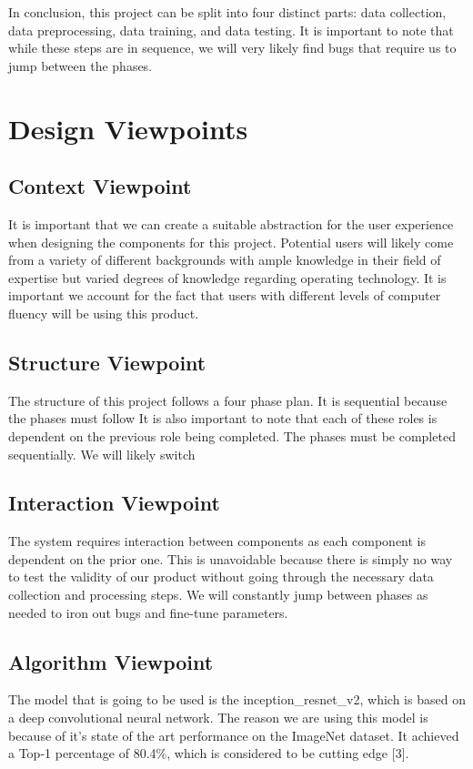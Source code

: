 \documentclass[onecolumn, draftclsnofoot,10pt, compsoc]{IEEEtran}
\begin{document}
In conclusion, this project can be split into four distinct parts: data collection, data preprocessing, data training, and data testing. It is important to note that while these steps are in sequence, we will very likely find bugs that require us to jump between the phases. 

\section{Design Viewpoints}

\subsection{Context Viewpoint}
It is important that we can create a suitable abstraction for the user experience when designing the components for this project. Potential users will likely come from a variety of different backgrounds with ample knowledge in their field of expertise but varied degrees of knowledge regarding operating technology. It is important we account for the fact that users with different levels of computer fluency will be using this product.
\subsection{Structure Viewpoint}
The structure of this project follows a four phase plan. It is sequential because the phases must follow  It is also important to note that each of these roles is dependent on the previous role being completed. The phases must be completed sequentially. We will likely switch 
\subsection{Interaction Viewpoint}
The system requires interaction between components as each component is dependent on the prior one. This is unavoidable because there is simply no way to test the validity of our product without going through the necessary data collection and processing steps. We will constantly jump between phases as needed to iron out bugs and fine-tune parameters.
\subsection{Algorithm Viewpoint}
The model that is going to be used is the inception\_resnet\_v2, which is based on a deep convolutional neural network. The reason we are using this model is because of it's state of the art performance on the ImageNet dataset. It achieved a Top-1 percentage of 80.4\%, which is considered to be cutting edge [3]. 
\end{document}
